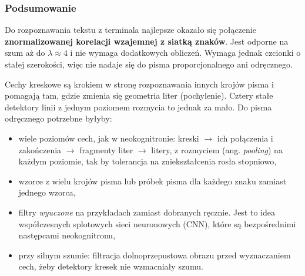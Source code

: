 \documentclass[12pt]{article}
\begin{document}
\subsubsection{Podsumowanie}

Do rozpoznawania tekstu z terminala najlepsze okazało się połączenie \textbf{znormalizowanej korelacji wzajemnej z siatką znaków}. Jest odporne na szum aż do $\lambda \approx 4$ i nie wymaga dodatkowych obliczeń. Wymaga jednak czcionki o stałej szerokości, więc nie nadaje się do pisma proporcjonalnego ani odręcznego.

Cechy kreskowe są krokiem w stronę rozpoznawania innych krojów pisma i pomagają tam, gdzie zmienia się geometria liter (pochylenie). Cztery stałe detektory linii z jednym poziomem rozmycia to jednak za mało. Do pisma odręcznego potrzebne byłyby:
\begin{itemize}
    \item wiele poziomów cech, jak w neokognitronie: kreski $\to$ ich połączenia i zakończenia $\to$ fragmenty liter $\to$ litery, z rozmyciem (ang. \emph{pooling}) na każdym poziomie, tak by tolerancja na zniekształcenia rosła stopniowo,
    \item wzorce z wielu krojów pisma lub próbek pisma dla każdego znaku zamiast jednego wzorca,
    \item filtry \emph{wyuczone} na przykładach zamiast dobranych ręcznie. Jest to idea współczesnych splotowych sieci neuronowych (CNN), które są bezpośrednimi następcami neokognitronu,
    \item przy silnym szumie: filtracja dolnoprzepustowa obrazu przed wyznaczaniem cech, żeby detektory kresek nie wzmacniały szumu.
\end{itemize}
\end{document}
